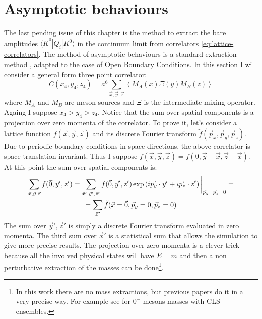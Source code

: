 \documentclass[english, LaM, oneside, noexaminfo]{sapthesis}
\newcommand{\la}{\langle}
\newcommand{\ra}{\rangle}
\newcommand{\obc}{Open Boundary Conditions}
\begin{document}
\section{Asymptotic behaviours}\label{sec:asympt-behav}
\noindent
The last pending issue of this chapter is the method to extract the bare amplitudes $\la \bar K^0 | Q_i | K^0 \ra$ in the continuum limit from correlators \ref{eq:lattice-correlators}.
The method of asymptotic behaviours is a standard extraction method \cite{montvay-munster}, adapted to the case of \obc\space \cite{ExtractionSpectralQuantities}.
In this section I will consider a general form three point correlator:
\begin{equation}\label{eq:correlator-prototype}
    C(x_4,y_4,z_4) = a^6\sum_{\vec x, \vec y, \vec z} \left\la M_A (x) \Xi (y) M_B (z) \right\ra
\end{equation}
where $M_{A}$ and $M_{B}$ are meson sources and $\Xi$ is the intermediate mixing operator.
Againg I suppose $x_4 > y_4 > z_4$.
Notice that the sum over spatial components is a projection over zero momenta of the correlator.
To prove it, let's consider a lattice function $f(\vec x,\vec y,\vec z)$ and its discrete Fourier transform $\tilde{f}(\vec p_x,\vec p_y,\vec p_z)$.
Due to periodic boundary conditions in space directions, the above correlator is space translation invariant.
Thus I suppose $f(\vec x, \vec y, \vec z) = f(0, \vec y - \vec x, \vec z - \vec x)$.
At this point the sum over spatial components is:
\begin{equation*}
    \begin{gathered}
        \sum_{\vec x, \vec y, \vec z} f(\vec 0,\vec y',\vec z') = \sum_{\vec x', \vec y', \vec z'} f(\vec 0,\vec y',\vec z') \hspace*{.5mm} \text{exp}\left(i\vec{p_y}\cdot\vec{y}'+i\vec{p_z}\cdot\vec{z}' \right)\bigg|_{\vec p_y = \vec p_z = 0} = \\
        = \sum_{\vec x'} \tilde{f}(\vec x = \vec 0, \vec p_y = 0, \vec p_z = 0)
    \end{gathered}
\end{equation*}
The sum over $\vec y', \vec z'$ is simply a discrete Fourier transform evaluated in zero momenta. The third sum over $\vec x'$ is a statistical sum that allows the simulation to give more precise results.
The projection over zero momenta is a clever trick because all the involved physical states will have $E=m$ and then a non perturbative extraction of the masses can be done\footnote{In this work there are no mass extractions, but previous papers do it in a very precise way. For example see \cite{LightMesons}\cite{OBC-tm} for $0^{-}$ mesons masses with CLS ensembles.}.
\end{document}
